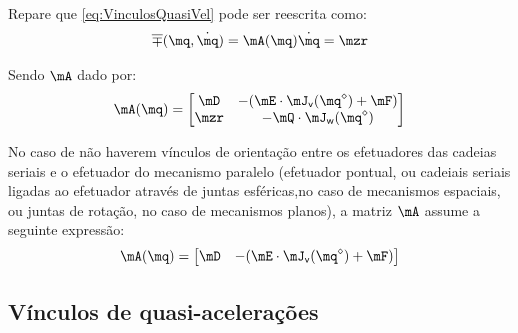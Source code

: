 \documentclass[]{politex}
\begin{document}
Repare que \eqref{eq:VinculosQuasiVel} pode ser reescrita como:
\begin{equation} \label{eq:VinculosQuasiVel2}
\overline{\mp}(\mq,\dot{\mq}) = \mA(\mq) \dot{\mq} = \mzr
\end{equation}

Sendo $\mA$ dado por:
\begin{equation}
\mA(\mq) = 
\begin{bmatrix}
\mD  & -(\mE \cdot \mJ_{\mathsf{v}}(\mq^\diamond) + \mF) \\
\mzr & -\mQ \cdot \mJ_{\mathsf{w}}(\mq^\diamond) \\
\end{bmatrix}
\end{equation}

No caso de não haverem vínculos de orientação entre os efetuadores das cadeias seriais e o efetuador do mecanismo paralelo (efetuador pontual, ou cadeiais seriais ligadas ao efetuador através de juntas esféricas,no caso de mecanismos espaciais, ou juntas de rotação, no caso de mecanismos planos), a matriz $\mA$ assume a seguinte expressão:
\begin{equation}
\mA(\mq) = 
\begin{bmatrix}
\mD  & -(\mE \cdot \mJ_{\mathsf{v}}(\mq^\diamond) + \mF) \\
\end{bmatrix}
\end{equation}


\subsection{Vínculos de quasi-acelerações} 
\end{document}
